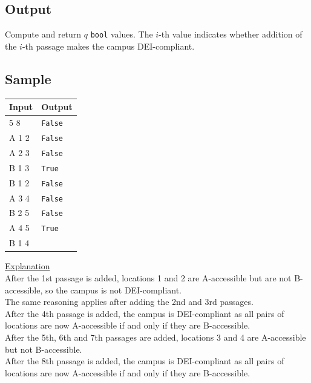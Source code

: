 \documentclass[a4paper]{exam}
\begin{document}
\begin{questions}
  \subsection*{Output}
  Compute and return $q$ \texttt{bool} values. The $i$-th value indicates whether addition of the $i$-th passage makes the campus DEI-compliant.

  \subsection*{Sample}
  \begin{minipage}[t]{.21\textwidth}
    \begin{tabular}[t]{|l|l|}
      \hline
      Input & Output\\
      \hline
      5 8 & \texttt{False}  \\
      A 1 2 & \texttt{False}  \\
      A 2 3 & \texttt{False}  \\
      B 1 3 & \texttt{True}  \\
      B 1 2 & \texttt{False}  \\
      A 3 4 & \texttt{False}  \\
      B 2 5 & \texttt{False}  \\
      A 4 5 & \texttt{True}  \\
      B 1 4 &   \\
      \hline
    \end{tabular}
  \end{minipage}
  \begin{minipage}[t]{.78\textwidth}
    \underline{Explanation}\\
    After the 1st passage is added, locations 1 and 2 are A-accessible but are not B-accessible, so the campus is not DEI-compliant.\\
    The same reasoning applies after adding the 2nd and 3rd passages.\\
    After the 4th passage is added, the campus is DEI-compliant as all pairs of locations are now A-accessible if and only if they are B-accessible.\\
    After the 5th, 6th and 7th passages are added, locations 3 and 4 are A-accessible but not B-accessible.\\
    After the 8th passage is added,  the campus is DEI-compliant as all pairs of locations are now A-accessible if and only if they are B-accessible.\\
  \end{minipage}


\end{questions}
\end{document}

